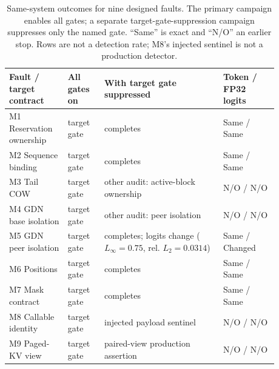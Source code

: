 \begin{table}[H]
\caption{Same-system outcomes for nine designed faults.  The primary campaign
enables all gates; a separate target-gate-suppression campaign suppresses only
the named gate.
``Same'' is exact and ``N/O'' an earlier stop.  Rows are not a detection rate;
M8's injected sentinel is not a production detector.}
\label{tab:first-gate-localization}
\centering\scriptsize
\setlength{\tabcolsep}{2.6pt}
\begin{tabular}{@{}p{0.19\linewidth}p{0.12\linewidth}p{0.39\linewidth}p{0.18\linewidth}@{}}
\toprule
Fault / target contract & All gates on & With target gate suppressed & Token / FP32 logits \\
\midrule
M1 Reservation ownership & target gate & completes & Same / Same \\
M2 Sequence binding & target gate & completes & Same / Same \\
M3 Tail COW & target gate & other audit: active-block ownership & N/O / N/O \\
M4 GDN base isolation & target gate & other audit: peer isolation & N/O / N/O \\
M5 GDN peer isolation & target gate & completes; logits change ($L_\infty=0.75$, rel. $L_2=0.0314$) & Same / Changed \\
M6 Positions & target gate & completes & Same / Same \\
M7 Mask contract & target gate & completes & Same / Same \\
M8 Callable identity & target gate & injected payload sentinel & N/O / N/O \\
M9 Paged-KV view & target gate & paired-view production assertion & N/O / N/O \\
\bottomrule
\end{tabular}
\end{table}
